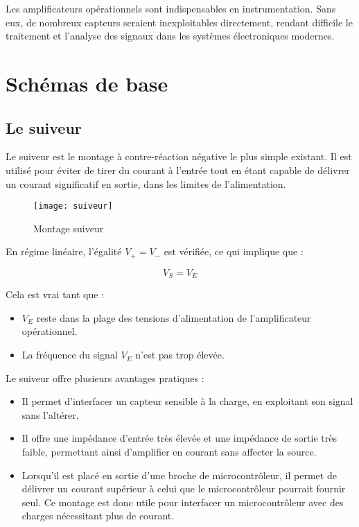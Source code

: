 Les amplificateurs opérationnels sont indispensables en instrumentation. Sans 
eux, de nombreux capteurs seraient inexploitables directement, rendant difficile 
le traitement et l’analyse des signaux dans les systèmes électroniques modernes.


\section{Schémas de base}

\subsection{Le suiveur}

Le suiveur est le montage à contre-réaction négative le plus simple existant. Il 
est utilisé pour éviter de tirer du courant à l’entrée tout en étant capable de 
délivrer un courant significatif en sortie, dans les limites de l’alimentation.

\begin{figure}
    \centering
    \texttt{[image: suiveur]}
    \caption{Montage suiveur}
    \label{fig:suiveur}
\end{figure}

En régime linéaire, l’égalité \( V_+ = V_- \) est vérifiée, ce qui implique que :

\[
V_S = V_E
\]

Cela est vrai tant que :
\begin{itemize}
    \item \( V_E \) reste dans la plage des tensions d’alimentation de 
    l’amplificateur opérationnel.
    \item La fréquence du signal \( V_E \) n’est pas trop élevée.
\end{itemize}

Le suiveur offre plusieurs avantages pratiques :
\begin{itemize}
    \item Il permet d’interfacer un capteur sensible à la charge, en exploitant 
    son signal sans l’altérer.
    \item Il offre une impédance d’entrée très élevée et une impédance de sortie
    très faible, permettant ainsi d’amplifier en courant sans affecter la source.
    \item Lorsqu'il est placé en sortie d’une broche de microcontrôleur, il 
    permet de délivrer un courant supérieur à celui que le microcontrôleur 
    pourrait fournir seul. Ce montage est donc utile pour interfacer un 
    microcontrôleur avec des charges nécessitant plus de courant.
\end{itemize}

